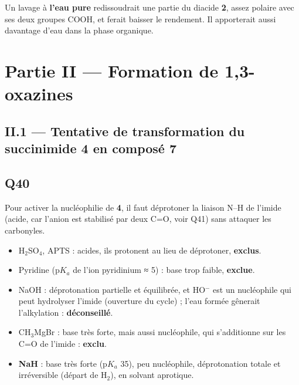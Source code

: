 \documentclass[11pt,a4paper]{article}
\providecommand{\tightlist}{\setlength{\itemsep}{0pt}\setlength{\parskip}{0pt}}
\newcommand{\equationajustee}[1]{%
  \sbox{\boiteequation}{$\displaystyle #1$}%
  \ifdim\wd\boiteequation>\linewidth
    \[\resizebox{\linewidth}{!}{\usebox{\boiteequation}}\]%
  \else
    \[#1\]%
  \fi}
\begin{document}
Un lavage à \textbf{l'eau pure} redissoudrait une partie du diacide \textbf{2}, assez polaire avec ses deux groupes COOH, et ferait baisser le rendement. Il apporterait aussi davantage d'eau dans la phase organique.

\hypertarget{partie-ii-formation-de-13-oxazines}{%
\section{Partie II --- Formation de 1,3-oxazines}\label{partie-ii-formation-de-13-oxazines}}

\hypertarget{ii.1-tentative-de-transformation-du-succinimide-4-en-composuxe9-7}{%
\subsection{II.1 --- Tentative de transformation du succinimide 4 en composé 7}\label{ii.1-tentative-de-transformation-du-succinimide-4-en-composuxe9-7}}

\hypertarget{q40}{%
\subsection{Q40}\label{q40}}

Pour activer la nucléophilie de \textbf{4}, il faut déprotoner la liaison N--H de l'imide (acide, car l'anion est stabilisé par deux C=O, voir Q41) sans attaquer les carbonyles.

\begin{itemize}
\tightlist
\item
  H\(_2\)SO\(_4\), APTS : acides, ils protonent au lieu de déprotoner, \textbf{exclus}.
\item
  Pyridine (p\(K_a\) de l'ion pyridinium ≈ 5) : base trop faible, \textbf{exclue}.
\item
  NaOH : déprotonation partielle et équilibrée, et HO\(^-\) est un nucléophile qui peut hydrolyser l'imide (ouverture du cycle) ; l'eau formée gênerait l'alkylation : \textbf{déconseillé}.
\item
  CH\(_3\)MgBr : base très forte, mais aussi nucléophile, qui s'additionne sur les C=O de l'imide : \textbf{exclu}.
\item
  \textbf{NaH} : base très forte (p\(K_a\) 35), peu nucléophile, déprotonation totale et irréversible (départ de H\(_2\)), en solvant aprotique.
\end{itemize}

\equationajustee{\boxed{\mathrm{R1}=\mathrm{NaH}}}
\end{document}
